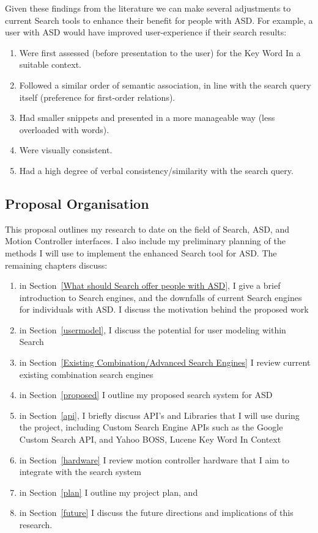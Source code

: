 \documentclass[10pt]{article}
\begin{document}
Given these findings from the literature we can make several adjustments to current Search tools to enhance their benefit for people with ASD. For example, a user with ASD would have improved user-experience if their search results:
\begin{enumerate}
\item Were first assessed (before presentation to the user) for the Key Word In a suitable context.
\item Followed a similar order of semantic association, in line with the search query itself (preference for first-order relations). 
\item Had smaller snippets and presented in a more manageable way (less overloaded with words).
\item Were visually consistent.
\item Had a high degree of verbal consistency/similarity with the search query.
\end{enumerate}

\subsection{Proposal Organisation}

This proposal outlines my research to date on the field of Search, ASD, and Motion Controller interfaces. I also include my preliminary planning of the methods I will use to implement the enhanced Search tool for ASD. The remaining chapters discuss:
\begin{enumerate}
\item in Section~\ref{What should Search offer people with ASD}, I give a brief introduction to Search engines, and the downfalls of current Search engines for individuals with ASD. I discuss the motivation behind the proposed work
\item in Section~\ref{usermodel}, I discuss the potential for user modeling within Search
\item in Section~\ref{Existing Combination/Advanced Search Engines} I review current existing combination search engines 
\item in Section~\ref{proposed} I outline my proposed search system for ASD
\item in Section~\ref{api}, I briefly discuss API's and Libraries that I will use during the project, including Custom Search Engine APIs such as the Google Custom Search API, and Yahoo BOSS, Lucene Key Word In Context
\item in Section~\ref{hardware} I review motion controller hardware that I aim to integrate with the search system
\item in Section~\ref{plan} I outline my project plan, and
\item in Section~\ref{future} I discuss the future directions and implications of this research.
\end{enumerate}
\end{document}
